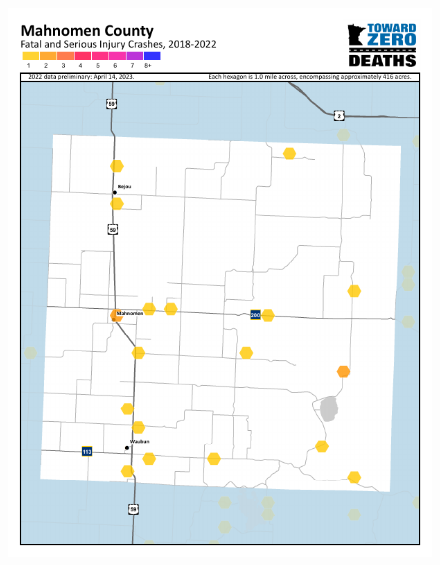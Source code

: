 \documentclass[
  a4paper,
  landscape]{scrreprt}
\begin{document}
\begin{figure}[H]
\begin{minipage}{0.33\linewidth}
\href{https://www.minnesotatzd.org/regions/westcentral}{\includegraphics{pages/Attachments/popEnvironmentalHealth/countyMahnomenMap_crashes2019_2023.png}}\end{minipage}%
%
\begin{minipage}{0.33\linewidth}

\end{minipage}
\end{figure}
\end{document}
